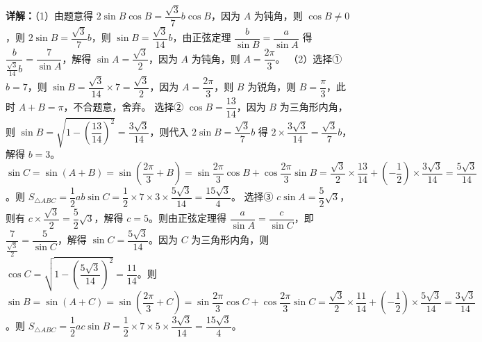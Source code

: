 \begin{question}[points=13]
\begin{solution}
\textbf{详解：}（1）由题意得 $2\sin B \cos B = \dfrac{\sqrt{3}}{7} b \cos B$，因为 $A$ 为钝角，则 $\cos B \neq 0$，则 $2\sin B = \dfrac{\sqrt{3}}{7} b$，则 $\sin B = \dfrac{\sqrt{3}}{14} b$，由正弦定理 $\dfrac{b}{\sin B} = \dfrac{a}{\sin A}$ 得 $\dfrac{b}{\frac{\sqrt{3}}{14}b} = \dfrac{7}{\sin A}$，解得 $\sin A = \dfrac{\sqrt{3}}{2}$，因为 $A$ 为钝角，则 $A = \dfrac{2\pi}{3}$。
（2）选择① $b=7$，则 $\sin B = \dfrac{\sqrt{3}}{14} \times 7 = \dfrac{\sqrt{3}}{2}$，因为 $A=\dfrac{2\pi}{3}$，则 $B$ 为锐角，则 $B = \dfrac{\pi}{3}$，此时 $A+B = \pi$，不合题意，舍弃。
选择② $\cos B = \dfrac{13}{14}$，因为 $B$ 为三角形内角，则 $\sin B = \sqrt{1-\left(\dfrac{13}{14}\right)^2} = \dfrac{3\sqrt{3}}{14}$，则代入 $2\sin B = \dfrac{\sqrt{3}}{7} b$ 得 $2\times \dfrac{3\sqrt{3}}{14} = \dfrac{\sqrt{3}}{7} b$，解得 $b=3$。$\sin C = \sin(A+B) = \sin\left(\dfrac{2\pi}{3}+B\right) = \sin\dfrac{2\pi}{3}\cos B + \cos\dfrac{2\pi}{3}\sin B = \dfrac{\sqrt{3}}{2}\times\dfrac{13}{14} + \left(-\dfrac{1}{2}\right)\times\dfrac{3\sqrt{3}}{14} = \dfrac{5\sqrt{3}}{14}$。则 $S_{\triangle ABC} = \dfrac{1}{2}ab\sin C = \dfrac{1}{2}\times7\times3\times\dfrac{5\sqrt{3}}{14} = \dfrac{15\sqrt{3}}{4}$。
选择③ $c\sin A = \dfrac{5}{2}\sqrt{3}$，则有 $c\times\dfrac{\sqrt{3}}{2} = \dfrac{5}{2}\sqrt{3}$，解得 $c=5$。则由正弦定理得 $\dfrac{a}{\sin A} = \dfrac{c}{\sin C}$，即 $\dfrac{7}{\frac{\sqrt{3}}{2}} = \dfrac{5}{\sin C}$，解得 $\sin C = \dfrac{5\sqrt{3}}{14}$。因为 $C$ 为三角形内角，则 $\cos C = \sqrt{1-\left(\dfrac{5\sqrt{3}}{14}\right)^2} = \dfrac{11}{14}$。则 $\sin B = \sin(A+C) = \sin\left(\dfrac{2\pi}{3}+C\right) = \sin\dfrac{2\pi}{3}\cos C + \cos\dfrac{2\pi}{3}\sin C = \dfrac{\sqrt{3}}{2}\times\dfrac{11}{14} + \left(-\dfrac{1}{2}\right)\times\dfrac{5\sqrt{3}}{14} = \dfrac{3\sqrt{3}}{14}$。则 $S_{\triangle ABC} = \dfrac{1}{2}ac\sin B = \dfrac{1}{2}\times7\times5\times\dfrac{3\sqrt{3}}{14} = \dfrac{15\sqrt{3}}{4}$。
\end{solution}
\end{question}

